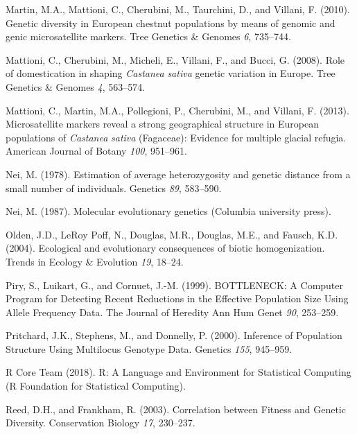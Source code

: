 \documentclass[12pt,a4paper,]{report}
\begin{document}
\leavevmode\hypertarget{ref-martin_genetic_2010}{}%
Martin, M.A., Mattioni, C., Cherubini, M., Taurchini, D., and Villani,
F. (2010). Genetic diversity in European chestnut populations by means
of genomic and genic microsatellite markers. Tree Genetics \& Genomes
\emph{6}, 735--744.

\leavevmode\hypertarget{ref-Mattioni2008}{}%
Mattioni, C., Cherubini, M., Micheli, E., Villani, F., and Bucci, G.
(2008). Role of domestication in shaping \emph{Castanea} \emph{sativa}
genetic variation in Europe. Tree Genetics \& Genomes \emph{4},
563--574.

\leavevmode\hypertarget{ref-Mattioni2013}{}%
Mattioni, C., Martin, M.A., Pollegioni, P., Cherubini, M., and Villani,
F. (2013). Microsatellite markers reveal a strong geographical structure
in European populations of \emph{Castanea} \emph{sativa} (Fagaceae):
Evidence for multiple glacial refugia. American Journal of Botany
\emph{100}, 951--961.

\leavevmode\hypertarget{ref-Nei1978}{}%
Nei, M. (1978). Estimation of average heterozygosity and genetic
distance from a small number of individuals. Genetics \emph{89},
583--590.

\leavevmode\hypertarget{ref-nei1987molecular}{}%
Nei, M. (1987). Molecular evolutionary genetics (Columbia university
press).

\leavevmode\hypertarget{ref-olden_ecological_2004}{}%
Olden, J.D., LeRoy Poff, N., Douglas, M.R., Douglas, M.E., and Fausch,
K.D. (2004). Ecological and evolutionary consequences of biotic
homogenization. Trends in Ecology \& Evolution \emph{19}, 18--24.

\leavevmode\hypertarget{ref-Piry1999}{}%
Piry, S., Luikart, G., and Cornuet, J.-M. (1999). BOTTLENECK: A Computer
Program for Detecting Recent Reductions in the Effective Population Size
Using Allele Frequency Data. The Journal of Heredity Ann Hum Genet
\emph{90}, 253--259.

\leavevmode\hypertarget{ref-pritchard_inference_2000}{}%
Pritchard, J.K., Stephens, M., and Donnelly, P. (2000). Inference of
Population Structure Using Multilocus Genotype Data. Genetics
\emph{155}, 945--959.

\leavevmode\hypertarget{ref-RCoreTeam2018}{}%
R Core Team (2018). R: A Language and Environment for Statistical
Computing (R Foundation for Statistical Computing).

\leavevmode\hypertarget{ref-Reed2003}{}%
Reed, D.H., and Frankham, R. (2003). Correlation between Fitness and
Genetic Diversity. Conservation Biology \emph{17}, 230--237.
\end{document}
